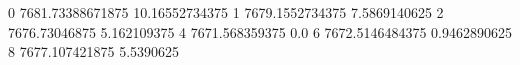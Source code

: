 0 7681.73388671875 10.16552734375
1 7679.1552734375 7.5869140625
2 7676.73046875 5.162109375
4 7671.568359375 0.0
6 7672.5146484375 0.9462890625
8 7677.107421875 5.5390625
